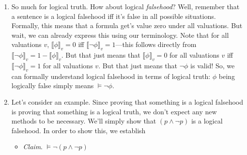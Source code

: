 \begin{enumerate}[\thesection.1]
\begin{enumerate}[(i)]
\begin{proof}
			\end{proof}
		Note that in each of the two proofs we used a distinction by cases on $\llbracket p\rrbracket_v=1$ or $\llbracket p\rrbracket_v=0$---that is, we've used bivalence. This is not by accident. There is a precise sense (that we're not going to go into here) in which all validities of classical logic ultimately depend on bivalence. The take away is that if you want to prove that a formula is valid, it's always a good idea to try to use bivalence in the proof. The usual way to use bivalence is to make a distinction by cases as we did in the proof, but sometimes you can also use bivalence for proof by contradiction---deriving that both $\llbracket \phi\rrbracket_v=1$ and $\llbracket \phi\rrbracket_v=0$ for some $\phi$ is a good aim when trying to prove something indirectly.
		
		\end{enumerate}
		
		\item So much for logical truth. How about logical \emph{falsehood}? Well, remember that a sentence is a logical falsehood iff it's false in all possible situations. Formally, this means that a formula get's value zero under all valuations. But wait, we can already express this using our terminology. Note that for all valuations $v$, $\llbracket\phi\rrbracket_v=0$ iff $\llbracket \neg\phi\rrbracket_v=1$---this follows directly from $\llbracket \neg\phi\rrbracket_v=1-\llbracket \phi\rrbracket_v$. But that just means that $\llbracket\phi\rrbracket_v=0$ for all valuations $v$ iff $\llbracket\neg \phi\rrbracket_v=1$ for all valuations $v$. But that just means that $\neg\phi$ is valid! So, we can formally understand logical falsehood in terms of logical truth: $\phi$ being logically false simply means $\vDash\neg\phi$. 
		
		\item Let's consider an example. Since proving that something is a logical falsehood is proving that something is a logical truth, we don't expect any new methods to be necessary. We'll simply show that $(p\land\neg p)$ is a logical falsehood. In order to show this, we establish
		
		\begin{itemize}
		
			\item \emph{Claim}. $\vDash\neg (p\land\neg p)$
			

\end{itemize}
\end{enumerate}
